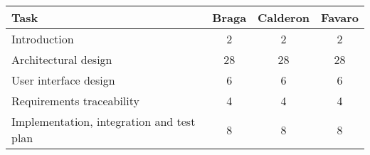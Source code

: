 \documentclass[./main.tex]{subfiles}
\begin{document}
\begin{table}[H]
\centering
\begin{tabular}{|l|c|c|c|}
\hline
Task & Braga & Calderon & Favaro\tabularnewline
\hline
Introduction & 2 & 2 & 2\tabularnewline
Architectural design & 28 & 28 & 28\tabularnewline
User interface design & 6 & 6 & 6\tabularnewline
Requirements traceability & 4 & 4 & 4\tabularnewline
Implementation, integration and test plan & 8 & 8 & 8\tabularnewline
\hline
\end{tabular}
\end{table}
\end{document}
